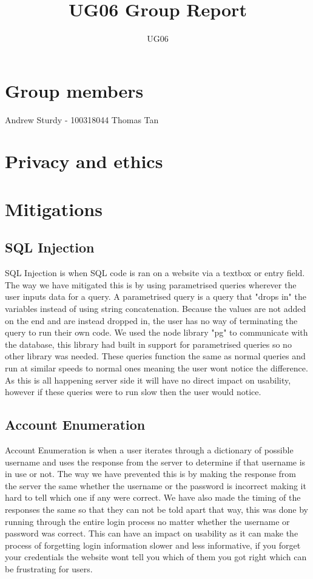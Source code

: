 \documentclass{cmpstyle}
\title{UG06 Group Report}
\author{UG06}
\begin{document}
\section{Group members}
Andrew Sturdy - 100318044\newline
Thomas\newline
Tan
\section{Privacy and ethics}

\section{Mitigations}

\subsection{SQL Injection}
SQL Injection is when SQL code is ran on a website via a textbox or entry field. The way we have mitigated this is by using parametrised queries wherever the user inputs data for a query. A parametrised query is a query that "drops in" the variables instead of using string concatenation. Because the values are not added on the end and are instead dropped in, the user has no way of terminating the query to run their own code. We used the node library "pg" to communicate with the database, this library had built in support for parametrised queries so no other library was needed. These queries function the same as normal queries and run at similar speeds to normal ones meaning the user wont notice the difference. As this is all happening server side it will have no direct impact on usability, however if these queries were to run slow then the user would notice.
\subsection{Account Enumeration}
Account Enumeration is when a user iterates through a dictionary of possible username and uses the response from the server to determine if that username is in use or not. The way we have prevented this is by making the response from the server the same whether the username or the password is incorrect making it hard to tell which one if any were correct. We have also made the timing of the responses the same so that they can not be told apart that way, this was done by running through the entire login process no matter whether the username or password was correct. This can have an impact on usability as it can make the process of forgetting login information slower and less informative, if you forget your credentials the website wont tell you which of them you got right which can be frustrating for users.
\end{document}
